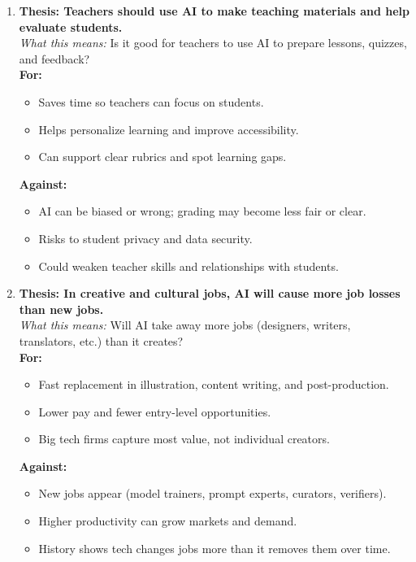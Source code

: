 \documentclass[12pt]{article}
\begin{document}
\begin{enumerate}
\item \textbf{Thesis: Teachers should use AI to make teaching materials and help evaluate students.}\\
\emph{What this means:} Is it good for teachers to use AI to prepare lessons, quizzes, and feedback?\\
\textbf{For:}
\begin{itemize}
    \item Saves time so teachers can focus on students.
    \item Helps personalize learning and improve accessibility.
    \item Can support clear rubrics and spot learning gaps.
\end{itemize}
\textbf{Against:}
\begin{itemize}
    \item AI can be biased or wrong; grading may become less fair or clear.
    \item Risks to student privacy and data security.
    \item Could weaken teacher skills and relationships with students.
\end{itemize}

\item \textbf{Thesis: In creative and cultural jobs, AI will cause more job losses than new jobs.}\\
\emph{What this means:} Will AI take away more jobs (designers, writers, translators, etc.) than it creates?\\
\textbf{For:}
\begin{itemize}
    \item Fast replacement in illustration, content writing, and post-production.
    \item Lower pay and fewer entry-level opportunities.
    \item Big tech firms capture most value, not individual creators.
\end{itemize}
\textbf{Against:}
\begin{itemize}
    \item New jobs appear (model trainers, prompt experts, curators, verifiers).
    \item Higher productivity can grow markets and demand.
    \item History shows tech changes jobs more than it removes them over time.
\end{itemize}


\end{enumerate}
\end{document}
